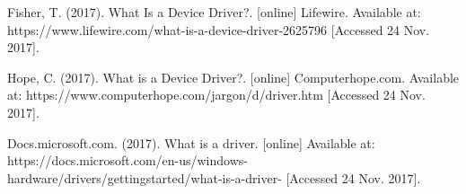 \documentclass[12pt,twoside]{article}
\begin{document}



\newpage

\begin{thebibliography}{99}

 Fisher, T. (2017). What Is a Device Driver?. [online] Lifewire. Available at: https://www.lifewire.com/what-is-a-device-driver-2625796 [Accessed 24 Nov. 2017].

 Hope, C. (2017). What is a Device Driver?. [online] Computerhope.com. Available at: https://www.computerhope.com/jargon/d/driver.htm [Accessed 24 Nov. 2017].

 Docs.microsoft.com. (2017). What is a driver. [online] Available at: https://docs.microsoft.com/en-us/windows-hardware/drivers/gettingstarted/what-is-a-driver- [Accessed 24 Nov. 2017].

\end{thebibliography}
\end{document}
